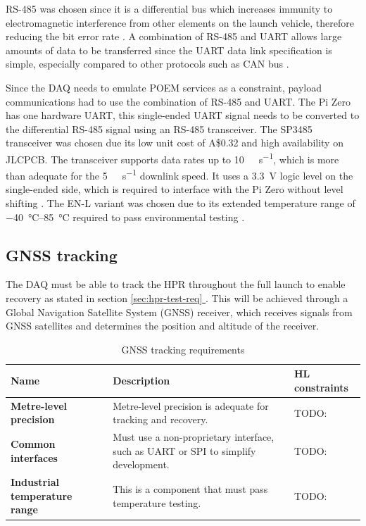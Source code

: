 \documentclass[]{report}
\newcommand*{\secref}[1]{section \hyperref[{#1}]{\ref*{#1} \nameref*{#1}}}
\newcommand{\aud}{A\$}
\begin{document}
RS-485 was chosen since it is a differential bus which increases immunity to electromagnetic interference from other elements on the launch vehicle, therefore reducing the bit error rate \cite{cratere2024board}. A combination of RS-485 and UART allows large amounts of data to be transferred since the UART data link specification is simple, especially compared to other protocols such as CAN bus \cite{cratere2024board}.

Since the DAQ needs to emulate POEM services as a constraint, payload communications had to use the combination of RS-485 and UART. The Pi Zero has one hardware UART, this single-ended UART signal needs to be converted to the differential RS-485 signal using an RS-485 transceiver. The SP3485 transceiver was chosen due its low unit cost of \aud 0.32 and high availability on JLCPCB. The transceiver supports data rates up to \SI{10}{\mega\bit\per\second}, which is more than adequate for the \SI{5}{\kilo\bit\per\second} downlink speed. It uses a \SI{3.3}{\volt} logic level on the single-ended side, which is required to interface with the Pi Zero without level shifting \cite{maxlinear2021sp3485}. The EN-L variant was chosen due to its extended temperature range of \SIrange{-40}{85}{\degreeCelsius} required to pass environmental testing \cite{maxlinear2021sp3485}.

\subsection{GNSS tracking}

The DAQ must be able to track the HPR throughout the full launch to enable recovery as stated in \secref{sec:hpr-test-req}. This will be achieved through a Global Navigation Satellite System (GNSS) receiver, which receives signals from GNSS satellites and determines the position and altitude of the receiver.


\begin{table}[H]
  \centering
  \begin{tabular}{|L{0.2\textwidth}|L{0.495\textwidth}|L{0.2\textwidth}|}
    \hline
    \textbf{Name}                         & \textbf{Description}                                                               & \textbf{HL constraints} \\ \hline
    \textbf{Metre-level precision}        & Metre-level precision is adequate for tracking and recovery.                       & TODO:                   \\\hline
    \textbf{Common interfaces}            & Must use a non-proprietary interface, such as UART or SPI to simplify development. & TODO:                   \\\hline
    \textbf{Industrial temperature range} & This is a component that must pass temperature testing.                            & TODO:                   \\\hline
  \end{tabular}
  \caption{GNSS tracking requirements}
  \label{tabl:gnss-requirements}
\end{table}
\end{document}
